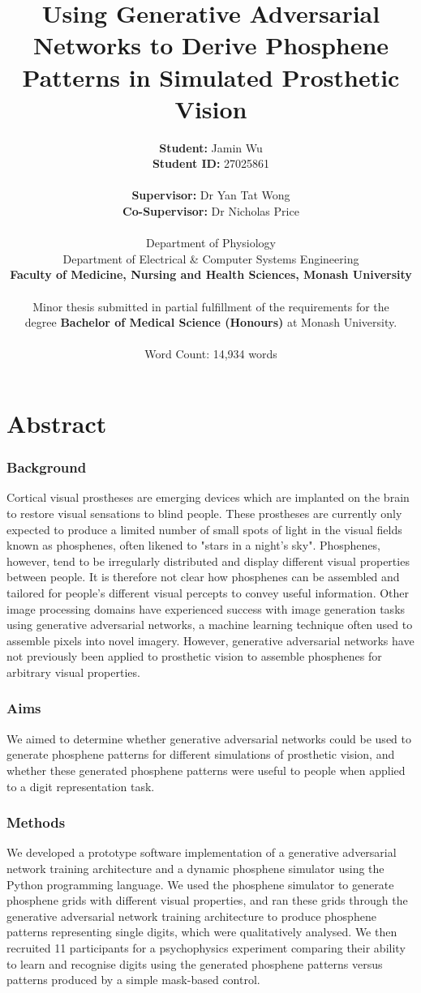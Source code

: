 \documentclass[a4paper,11pt,openany]{book}
\author{\textbf{Student:} Jamin Wu \\ \textbf{Student ID:} 27025861 \\ \\ \textbf{Supervisor:} Dr Yan Tat Wong \\ \textbf{Co-Supervisor:} Dr Nicholas Price \\ \\ Department of Physiology \\ Department of Electrical \& Computer Systems Engineering \\ \textbf{Faculty of Medicine, Nursing and Health Sciences, Monash University} \\ \\ Minor thesis submitted in partial fulfillment of the requirements for the \\ degree \textbf{Bachelor of Medical Science (Honours)} at Monash University. \\ \\ Word Count: 14,934 words}
\date{}
\title{\textbf{Using Generative Adversarial Networks to Derive Phosphene Patterns in Simulated Prosthetic Vision}}
\begin{document}
\maketitle
\clearpage

\section*{Abstract}

\subsubsection*{Background}
Cortical visual prostheses are emerging devices which are implanted on the brain to restore visual sensations to blind people.
These prostheses are currently only expected to produce a limited number of small spots of light in the visual fields known as phosphenes, often likened to "stars in a night's sky".
Phosphenes, however, tend to be irregularly distributed and display different visual properties between people.
It is therefore not clear how phosphenes can be assembled and tailored for people's different visual percepts to convey useful information.
Other image processing domains have experienced success with image generation tasks using generative adversarial networks, a machine learning technique often used to assemble pixels into novel imagery.
However, generative adversarial networks have not previously been applied to prosthetic vision to assemble phosphenes for arbitrary visual properties.

\subsubsection*{Aims}
We aimed to determine whether generative adversarial networks could be used to generate phosphene patterns for different simulations of prosthetic vision, and whether these generated phosphene patterns were useful to people when applied to a digit representation task.

\subsubsection*{Methods}
We developed a prototype software implementation of a generative adversarial network training architecture and a dynamic phosphene simulator using the Python programming language.
We used the phosphene simulator to generate phosphene grids with different visual properties, and ran these grids through the generative adversarial network training architecture to produce phosphene patterns representing single digits, which were qualitatively analysed.
We then recruited 11 participants for a psychophysics experiment comparing their ability to learn and recognise digits using the generated phosphene patterns versus patterns produced by a simple mask-based control.
\end{document}
